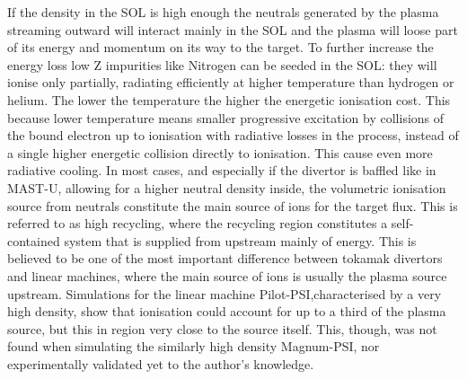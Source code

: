 If the density in the SOL is high enough the neutrals generated by the plasma streaming outward will interact mainly in the SOL and the plasma will loose part of its energy and momentum on its way to the target. To further increase the energy loss low Z impurities like Nitrogen can be seeded in the SOL: they will ionise only partially, radiating efficiently at higher temperature than hydrogen or helium. The lower the temperature the higher the energetic ionisation cost. This because lower temperature means smaller progressive excitation by collisions of the bound electron up to ionisation with radiative losses in the process, instead of a single higher energetic collision directly to ionisation. This cause even more radiative cooling. In most cases, and especially if the divertor is baffled like in MAST-U, allowing for a higher neutral density inside, the volumetric ionisation source from neutrals constitute the main source of ions for the target flux.\cite{Krasheninnikov2016,Krasheninnikov2017a,Lipschultz1999} This is referred to as high recycling, where the recycling region constitutes a self-contained system that is supplied from upstream mainly of energy. This is believed to be one of the most important difference between tokamak divertors and linear machines, where the main source of ions is usually the plasma source upstream. Simulations for the linear machine Pilot-PSI,characterised by a very high density, show that ionisation could account for up to a third of the plasma source, but this in  region very close to the source itself.\cite{Jesko2018,Hayashi2016} This, though, was not found when simulating the similarly high density Magnum-PSI, nor experimentally validated yet to the author's knowledge.\cite{Chandra2022}

